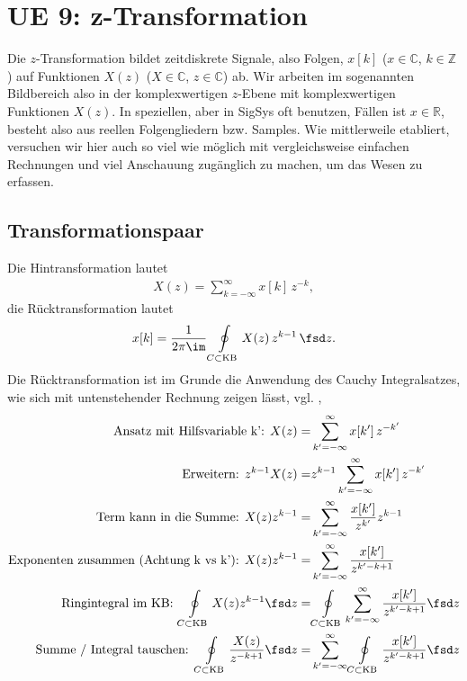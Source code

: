 \clearpage
\section{UE 9: z-Transformation}
%
Die $z$-Transformation bildet zeitdiskrete Signale, also Folgen, $x[k]$
($x\in\mathbb{C}$, $k\in\mathbb{Z}$)
auf Funktionen $X(z)$ ($X\in\mathbb{C}$, $z\in\mathbb{C}$)
ab.
%
Wir arbeiten im sogenannten Bildbereich also in der komplexwertigen $z$-Ebene mit
komplexwertigen Funktionen $X(z)$.
%
In speziellen, aber in SigSys oft benutzen, Fällen ist $x\in\mathbb{R}$, besteht
also aus reellen Folgengliedern bzw. Samples.
%
Wie mittlerweile etabliert, versuchen wir hier auch so viel wie möglich mit
vergleichsweise einfachen Rechnungen und viel Anschauung zugänglich zu machen,
um das Wesen zu erfassen.
%


\subsection*{Transformationspaar}
Die Hintransformation lautet
\begin{align}
X(z) = \sum_{k=-\infty}^{\infty} x[k] \, z^{-k},
\end{align}
die Rücktransformation lautet
\begin{align}
x[k] = \frac{1}{2\pi \im} \oint\limits_{C \subset \text{KB}} X(z) \, z^{k-1} \, \fsd z.
\end{align}
%
Die Rücktransformation ist im Grunde die Anwendung des Cauchy
Integralsatzes, wie sich mit untenstehender Rechnung zeigen lässt, vgl.
\cite[S.\,152]{Wunsch1972}, \cite[S.\,180ff]{Wunsch2006a}
\begin{align}
\text{Ansatz mit Hilfsvariable k':   } X(z) =& \sum_{k'=-\infty}^{\infty} x[k'] \, z^{-k'}\\
\text{Erweitern:   } z^{k-1} X(z) =& z^{k-1} \sum_{k'=-\infty}^{\infty} x[k'] \, z^{-k'}\\
\text{Term kann in die Summe:   } X(z) z^{k-1} =& \sum_{k'=-\infty}^{\infty} \frac{x[k']}{z^{k'}} z^{k-1}\\
\text{Exponenten zusammen (Achtung k vs k'):    } X(z) z^{k-1} =& \sum_{k'=-\infty}^{\infty} \frac{x[k']}{z^{k'-k+1}}\\
\text{Ringintegral im KB:   } \oint\limits_{C \subset \text{KB}} X(z) z^{k-1} \fsd z =&
\oint\limits_{C \subset \text{KB}}
\sum_{k'=-\infty}^{\infty} \frac{x[k']}{z^{k'-k+1}} \fsd z\\
\text{Summe / Integral tauschen:   }
\oint\limits_{C \subset \text{KB}} \frac{X(z)}{z^{-k+1}} \fsd z =&
\sum_{k'=-\infty}^{\infty}
\oint\limits_{C \subset \text{KB}}
\frac{x[k']}{z^{k'-k+1}} \fsd z
\end{align}
